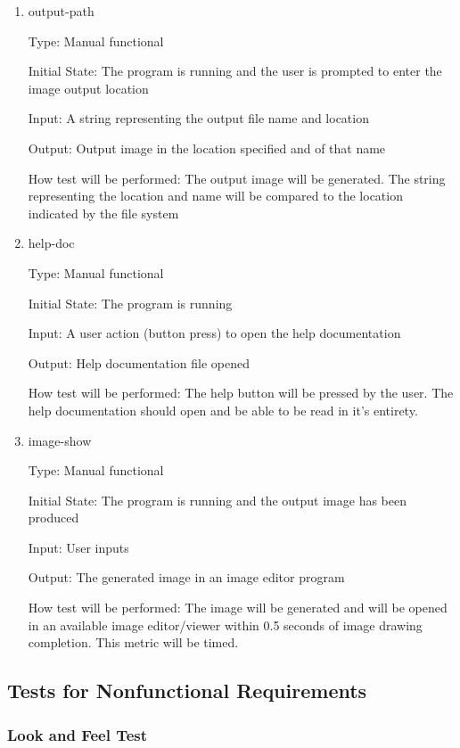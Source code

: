 \documentclass[12pt, titlepage]{article}
\begin{document}
\begin{enumerate}
\item{output-path}

Type: Manual functional

Initial State: The program is running and the user is prompted to enter the image output location

Input: A string representing the output file name and location

Output: Output image in the location specified and of that name

How test will be performed: The output image will be generated. The string representing the location and name will be compared to the location indicated by the file system

\item{help-doc}

Type: Manual functional

Initial State: The program is running

Input: A user action (button press) to open the help documentation

Output: Help documentation file opened

How test will be performed: The help button will be pressed by the user. The help documentation should open and be able to be read in it's entirety.

\item{image-show}

Type: Manual functional

Initial State: The program is running and the output image has been produced

Input: User inputs

Output: The generated image in an image editor program

How test will be performed: The image will be generated and will be opened in an available image editor/viewer within 0.5 seconds of image drawing completion. This metric will be timed.

\end{enumerate}

\subsection{Tests for Nonfunctional Requirements}

\subsubsection{Look and Feel Test}
\end{document}
